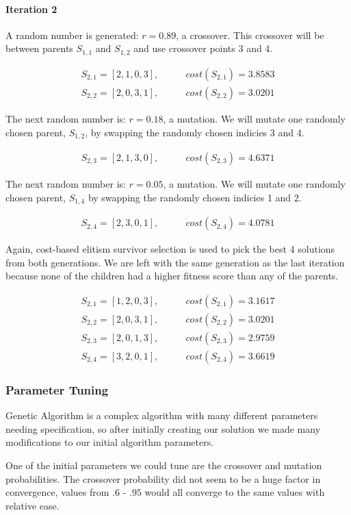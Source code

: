 \documentclass[a4paper]{article}
\newcommand{\subsubsubsection}[1]{\paragraph{#1} \mbox{}}
\begin{document}
\subsubsubsection{Iteration 2}
A random number is generated: $r=0.89$, a crossover. This crossover will be between parents $S_{1,1}$ and $S_{1,2}$ and use crossover points 3 and 4.

\begin{align*}
S_{2,1} = [2, 1, 0, 3], & \qquad cost(S_{2,1}) = 3.8583 \\
S_{2,2} = [2, 0, 3, 1], & \qquad cost(S_{2,2}) = 3.0201
\end{align*}

The next random number is: $r=0.18$, a mutation. We will mutate one randomly chosen parent, $S_{1,2}$, by swapping the randomly chosen indicies 3 and 4.

\begin{align*}
S_{2,3} = [2, 1, 3, 0], & \qquad cost(S_{2,3}) = 4.6371
\end{align*}

The next random number is: $r=0.05$, a mutation. We will mutate one randomly chosen parent, $S_{1,4}$ by swapping the randomly chosen indicies 1 and 2.

\begin{align*}
S_{2,4} = [2, 3, 0, 1], & \qquad cost(S_{2,4}) = 4.0781
\end{align*}

Again, cost-based elitism survivor selection is used to pick the best 4 solutions from both generations. We are left with the same generation as the last iteration because none of the children had a higher fitness score than any of the parents.

\begin{align*}
S_{2,1} = [1, 2, 0, 3], & \qquad cost(S_{2,1}) = 3.1617 \\
S_{2,2} = [2, 0, 3, 1], & \qquad cost(S_{2,2}) = 3.0201 \\
S_{2,3} = [2, 0, 1, 3], & \qquad cost(S_{2,3}) = 2.9759 \\
S_{2,4} = [3, 2, 0, 1], & \qquad cost(S_{2,4}) = 3.6619
\end{align*}

\subsubsection{Parameter Tuning}

Genetic Algorithm is a complex algorithm with many different parameters needing specification, so after initially creating our solution we made many modifications to our initial algorithm parameters.

One of the initial parameters we could tune are the crossover and mutation probabilities. The crossover probability did not seem to be a huge factor in convergence, values from $.6$ - $.95$ would all converge to the same values with relative ease.
\end{document}
